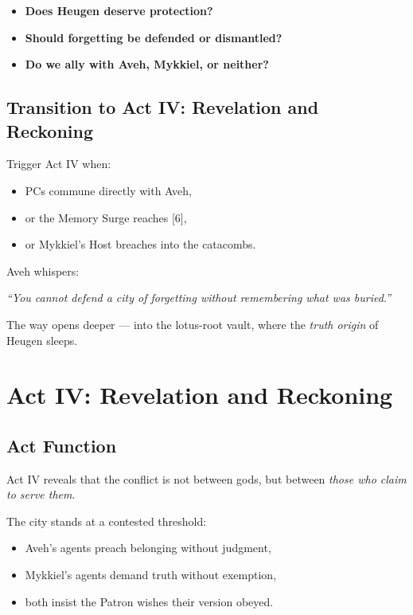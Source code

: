 \documentclass[11pt]{article}
\begin{document}
\begin{itemize}[leftmargin=*]
  \item \textbf{Does Heugen deserve protection?}
  \item \textbf{Should forgetting be defended or dismantled?}
  \item \textbf{Do we ally with Aveh, Mykkiel, or neither?}
\end{itemize}

\bigskip

\subsection*{Transition to Act IV: Revelation and Reckoning}

Trigger Act IV when:
\begin{itemize}[leftmargin=*]
  \item PCs commune directly with Aveh,
  \item or the Memory Surge reaches [6],
  \item or Mykkiel's Host breaches into the catacombs.
\end{itemize}

Aveh whispers:

\begin{center}
  \emph{``You cannot defend a city of forgetting without remembering what was buried.''}
\end{center}

The way opens deeper --- into the lotus-root vault,
where the \emph{truth origin} of Heugen sleeps.

\newpage

\section{Act IV: Revelation and Reckoning}
\label{sec:act4}

\subsection*{Act Function}

Act IV reveals that the conflict is not between gods, but between
\emph{those who claim to serve them}.

The city stands at a contested threshold:
\begin{itemize}[leftmargin=*]
  \item Aveh's agents preach belonging without judgment,
  \item Mykkiel's agents demand truth without exemption,
  \item both insist the Patron wishes their version obeyed.
\end{itemize}
\end{document}
